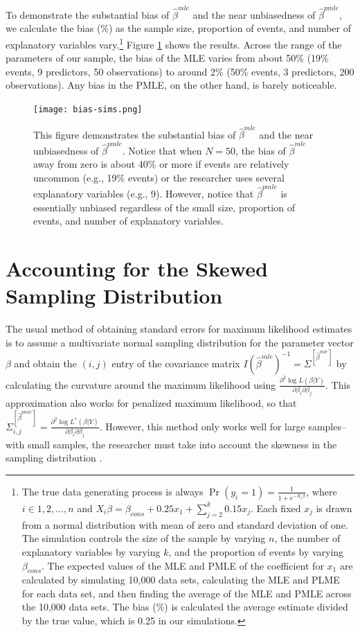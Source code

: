 \documentclass[12pt]{article}
\begin{document}
To demonstrate the substantial bias of $\hat{\beta}^{mle}$ and the near unbiasedness of $\hat{\beta}^{pmle}$, we calculate the bias (\%) as the sample size, proportion of events, and number of explanatory variables vary.\footnote{The true data generating process is always $\Pr(y_i = 1) = \frac{1}{1 + e^{-X_i \beta}}$, where $i \in 1, 2,..., n$ and $X_i \beta = \beta_{cons} + 0.25 x_1 + \sum_{j = 2}^k 0.15 x_j$. Each fixed $x_j$ is drawn from a normal distribution with mean of zero and standard deviation of one. The simulation controls the size of the sample by varying $n$, the number of explanatory variables by varying $k$, and the proportion of events by varying $\beta_{cons}$. The expected values of the MLE  and PMLE of the coefficient for $x_1$ are calculated by simulating 10,000 data sets, calculating the MLE and PLME for each data set, and then finding the average of the MLE and PMLE across the 10,000 data sets. The bias (\%) is calculated the average estimate divided by the true value, which is 0.25 in our simulations.} Figure \ref{fig:bias-sims} shows the results. Across the range of the parameters of our sample, the bias of the MLE varies from about 50\% (19\% events, 9 predictors, 50 observations) to around 2\% (50\% events, 3 predictors, 200 observations). Any bias in the PMLE, on the other hand, is barely noticeable.

\begin{figure}[H]
\begin{center}
\texttt{[image: bias-sims.png]}
\caption{This figure demonstrates the substantial bias of $\hat{\beta}^{mle}$ and the near unbiasedness of $\hat{\beta}^{pmle}$. Notice that when $N = 50$, the bias of $\hat{\beta}^{mle}$ away from zero is about 40\% or more if events are relatively uncommon (e.g., 19\% events) or the researcher uses several explanatory variables (e.g., 9). However, notice that $\hat{\beta}^{pmle}$ is essentially unbiased regardless of the small size, proportion of events, and number of explanatory variables.}\label{fig:bias-sims}
\end{center}
\end{figure}

\section*{Accounting for the Skewed Sampling Distribution}

The usual method of obtaining standard errors for maximum likelihood estimates is to assume a multivariate normal sampling distribution for the parameter vector $\beta$ and obtain the $(i, j)$ entry of the covariance matrix $I(\hat{\beta}^{mle})^{-1} = \Sigma^{[\hat{\beta}^{mle}]}$ by calculating the curvature around the maximum likelihood using $\frac{\partial^2 \log L(\beta | Y)}{\partial \beta_i \partial \beta_j}$. This approximation also works for penalized maximum likelihood, so that $\Sigma^{[\hat{\beta}^{pmle}]}_{i,j} = \frac{\partial^2 \log L^*(\beta | Y)}{\partial \beta_i \partial \beta_j}$. However, this method only works well for large samples--with small samples, the researcher must take into account the skewness in the sampling distribution \citep{Barndorff-NielsonCox1994}.
\end{document}
